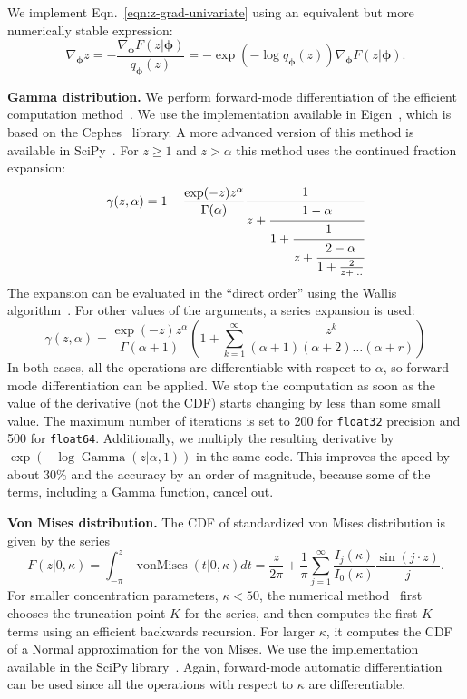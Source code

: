 \documentclass{article}
\let\vec\bm
\begin{document}
\begin{refsection}
We implement Eqn.~\eqref{eqn:z-grad-univariate} using an equivalent but more numerically stable expression:
\begin{equation}
    \nabla_{\vec{\phi}} z = - \frac{\nabla_{\vec{\phi}} F(z | \vec{\phi})}{q_{\vec{\phi}} (z)} = -\exp( - \log q_{\vec{\phi}} (z)) \nabla_{\vec{\phi}} F(z | \vec{\phi}).
\end{equation}

\textbf{Gamma distribution.}
We perform forward-mode differentiation of the efficient computation method~\cite{bhattacharjee1970incgamma}.
We use the implementation available in Eigen~\cite{eigenweb}, which is based on the Cephes~\cite{moshier2000cephes} library. A more advanced version of this method is available in SciPy~\cite{jones2001scipy}.
For $z \geq 1$ and $z > \alpha$ this method uses the continued fraction expansion:
\begin{equation}
    \gamma(z, \alpha) = 1 - \frac{\exp(-z) z^\alpha}{\Gamma(\alpha)} \cfrac{1}{z + \cfrac{1 - \alpha}{1+ \cfrac{1}{z + \cfrac{2 - \alpha}{1 + \frac{2}{z+ \dots}}}}}
\end{equation}
The expansion can be evaluated in the ``direct order'' using the Wallis algorithm~\cite{press2007numerical}.
For other values of the arguments, a series expansion is used:
\begin{equation}
    \gamma(z, \alpha) = \frac{\exp(-z) z^\alpha}{\Gamma(\alpha + 1)} \left( 1 + \sum_{k=1}^\infty \frac{z^k}{(\alpha+1) (\alpha+2) \dots (\alpha+r)} \right)
\end{equation}
In both cases, all the operations are differentiable with respect to $\alpha$, so forward-mode differentiation can be applied.
We stop the computation as soon as the value of the derivative (not the CDF) starts changing by less than some small value.
The maximum number of iterations is set to 200 for \texttt{float32} precision and 500 for \texttt{float64}.
Additionally, we multiply the resulting derivative by $\exp(- \log \operatorname{Gamma}(z|\alpha, 1))$ in the same code.
This improves the speed by about 30\% and the accuracy by an order of magnitude, because some of the terms, including a Gamma function, cancel out.

\textbf{Von Mises distribution.}
The CDF of standardized von Mises distribution is given by the series
\begin{equation}
    F(z | 0, \kappa) = \int_{-\pi}^z \operatorname{vonMises}(t | 0, \kappa) dt = \frac{z}{2\pi} + \frac{1}{\pi} \sum_{j=1}^\infty \frac{I_j(\kappa)}{I_0(\kappa)} \frac{\sin(j \cdot z)}{j}.
    \label{eqn:vm-series}
\end{equation}
For smaller concentration parameters, $\kappa < 50$, the numerical method~\cite{hill1977algorithm} first chooses the truncation point $K$ for the series, and then computes the first $K$ terms using an efficient backwards recursion.
For larger $\kappa$, it computes the CDF of a Normal approximation for the von Mises.
We use the implementation available in the SciPy library~\cite{jones2001scipy}.
Again, forward-mode automatic differentiation can be used since all the operations with respect to $\kappa$ are differentiable.


\end{refsection}
\end{document}
